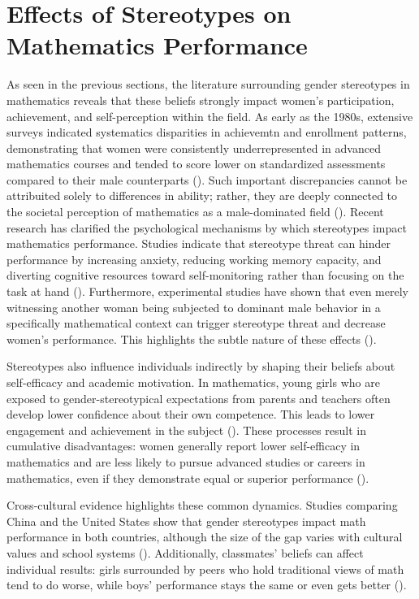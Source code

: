 \section{Effects of Stereotypes on Mathematics Performance}
As seen in the previous sections, the literature surrounding gender stereotypes in mathematics reveals that these beliefs strongly impact women's participation, achievement, and self-perception within the field. 
As early as the 1980s, extensive surveys indicated systematics disparities in achievemtn and enrollment patterns, demonstrating that women were consistently underrepresented in advanced mathematics courses and tended to score lower on standardized assessments compared to their male counterparts (\cite{Armstrong}).
Such important discrepancies cannot be attribuited solely to differences in ability; rather, they are deeply connected to the societal perception of mathematics as a male-dominated field (\cite{FennemaTartre1985,Plante2009}).
Recent research has clarified the psychological mechanisms by which stereotypes impact mathematics performance. Studies indicate that stereotype threat can hinder performance by increasing anxiety, reducing working memory capacity, and diverting cognitive resources toward self-monitoring rather than focusing on the task at hand (\cite{Schmader2008,Spencer2016}). Furthermore, experimental studies have shown that even merely witnessing another woman being subjected to dominant male behavior in a specifically mathematical context  can trigger stereotype threat and decrease women's performance. This highlights the subtle nature of these effects (\cite{VanLooRydell2014}).

Stereotypes also influence individuals indirectly by shaping their beliefs about self-efficacy and academic motivation.  In mathematics, young girls who are exposed to gender-stereotypical expectations from parents and teachers often develop lower confidence about their own competence. This leads to lower engagement and achievement in the subject (\cite{Jacobs1991,Gunderson2012}). These processes result in cumulative disadvantages: women generally report lower self-efficacy in mathematics and are less likely to pursue advanced studies or careers in mathematics, even if they demonstrate equal or superior performance (\cite{Zel,Beat}).

Cross-cultural evidence highlights these common dynamics. Studies comparing China and the United States show that gender stereotypes impact math performance in both countries, although the size of the gap varies with cultural values and school systems (\cite{Tsui2007,LiuWilson2009}). Additionally, classmates' beliefs can affect individual results: girls surrounded by peers who hold traditional views of math tend to do worse, while boys' performance stays the same or even gets better (\cite{Smith22}).

